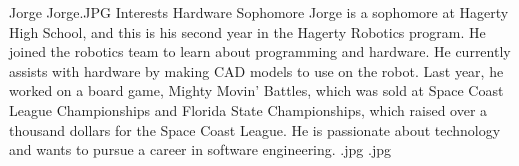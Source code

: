 \insertbio
{Jorge}
{Jorge.JPG}
{Interests}
{Hardware}
{Sophomore}
{
Jorge is a sophomore at Hagerty High School, and this is his second year in the Hagerty Robotics program. He joined the robotics team to learn about programming and hardware. He currently assists with hardware by making CAD models to use on the robot. Last year, he worked on a board game, Mighty Movin’ Battles, which was sold at Space Coast League Championships and Florida State Championships, which raised over a thousand dollars for the Space Coast League. He is passionate about technology and wants to pursue a career in software engineering.
}
{.jpg}
{.jpg}